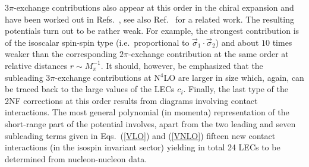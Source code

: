 \documentclass[aps,rmp,nofootinbib,twocolumn,floatfix]{revtex4}
\begin{document}
$3\pi$-exchange contributions also appear at this
order in the chiral expansion and have been worked out in
Refs.~\cite{Kaiser:1999ff,Kaiser:1999jg}, see also Ref.~\cite{Pupin:1999ba}
for a related work. The resulting potentials turn out to be rather weak.
For example, the strongest contribution is of the isoscalar spin-spin type
(i.e.~proportional to $\vec \sigma_1 \cdot \vec \sigma_2$) and about $10$ times
weaker than the corresponding $2\pi$-exchange contribution at the same order at
relative distances $r \sim M_\pi^{-1}$. It should, however, be emphasized that
the subleading $3\pi$-exchange contributions at N$^4$LO are
larger in size \cite{Kaiser:2001dm} which, again, can be traced back to the large values of the
LECs $c_i$. Finally, the last type of the 2NF corrections at this order results from
diagrams involving contact interactions. The most general polynomial (in
momenta) representation of the short-range part of the potential involves,
apart from the two leading and seven subleading terms given in
Eqs.~(\ref{VLO}) and (\ref{VNLO}) fifteen new contact interactions (in the
isospin invariant sector) yielding in total 24 LECs to be determined from
nucleon-nucleon data.  
\end{document}
